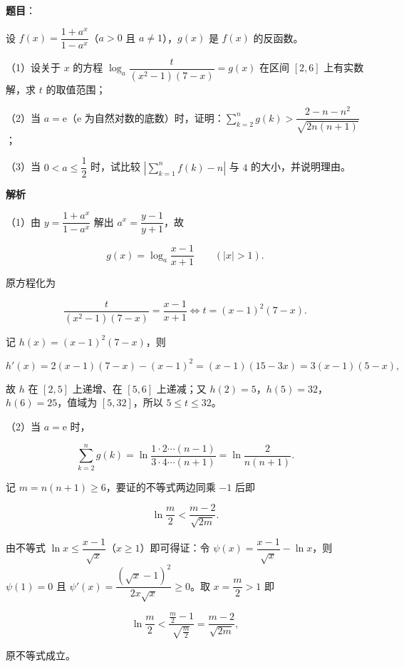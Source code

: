 \begin{answer}

\textbf{题目}：

设 $f(x)=\dfrac{1+a^x}{1-a^x}$（$a>0$ 且 $a\neq1$），$g(x)$ 是 $f(x)$ 的反函数。

（1）设关于 $x$ 的方程 $\log_a\dfrac{t}{(x^2-1)(7-x)}=g(x)$ 在区间 $[2,6]$ 上有实数解，求 $t$ 的取值范围；

（2）当 $a=\mathrm e$（$\mathrm e$ 为自然对数的底数）时，证明：$\sum\limits_{k=2}^ng(k)>\dfrac{2-n-n^2}{\sqrt{2n(n+1)}}$；

（3）当 $0<a\leqslant\dfrac{1}{2}$ 时，试比较 $\left|\sum\limits_{k=1}^nf(k)-n\right|$ 与 $4$ 的大小，并说明理由。

\textbf{解析}

（1）由 $y=\dfrac{1+a^x}{1-a^x}$ 解出 $a^x=\dfrac{y-1}{y+1}$，故

\nopagebreak[4]
\[g(x)=\log_a\frac{x-1}{x+1}\qquad\left(|x|>1\right).\]

原方程化为

\nopagebreak[4]
\[\frac{t}{(x^2-1)(7-x)}=\frac{x-1}{x+1}\iff t=(x-1)^2(7-x).\]

记 $h(x)=(x-1)^2(7-x)$，则

\nopagebreak[4]
\[h'(x)=2(x-1)(7-x)-(x-1)^2=(x-1)(15-3x)=3(x-1)(5-x),\]

故 $h$ 在 $[2,5]$ 上递增、在 $[5,6]$ 上递减；又 $h(2)=5$，$h(5)=32$，$h(6)=25$，值域为 $[5,32]$，所以 $5\leqslant t\leqslant32$。

（2）当 $a=\mathrm e$ 时，

\nopagebreak[4]
\[\sum_{k=2}^ng(k)=\ln\frac{1\cdot2\cdots(n-1)}{3\cdot4\cdots(n+1)}=\ln\frac{2}{n(n+1)}.\]

记 $m=n(n+1)\geqslant6$，要证的不等式两边同乘 $-1$ 后即

\nopagebreak[4]
\[\ln\frac m2<\frac{m-2}{\sqrt{2m}}.\]

由不等式 $\ln x\leqslant\dfrac{x-1}{\sqrt x}$（$x\geqslant1$）即可得证：令 $\psi(x)=\dfrac{x-1}{\sqrt x}-\ln x$，则 $\psi(1)=0$ 且 $\psi'(x)=\dfrac{\left(\sqrt x-1\right)^2}{2x\sqrt x}\geqslant0$。取 $x=\dfrac m2>1$ 即

\nopagebreak[4]
\[\ln\frac m2<\frac{\frac m2-1}{\sqrt{\frac m2}}=\frac{m-2}{\sqrt{2m}},\]

原不等式成立。


\end{answer}
